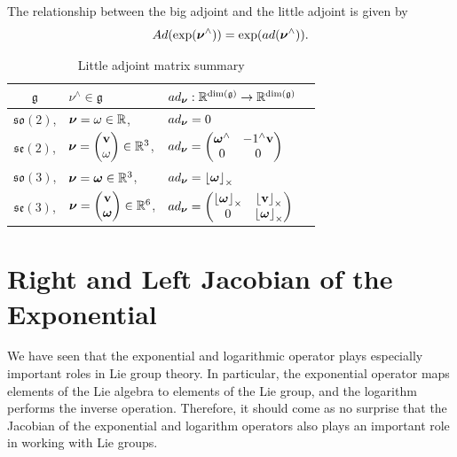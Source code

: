 The relationship between the big adjoint and the little adjoint is given by
\[
Ad(\exp(\boldsymbol{\nu}^\wedge)) = \exp(ad(\boldsymbol{\nu}^\wedge)).
\]

\begin{table}[hhhht]
\caption{Little adjoint matrix summary}
\label{tab:little_adjoint_matrix}
\bgroup
\def\arraystretch{1.0}
\begin{tabular}{clll}
	\toprule
	$\mathfrak{g}$ & $\nu^\wedge \in \mathfrak{g}$ & $ad_{\boldsymbol{\nu}}: \mathbb{R}^{\text{dim}(\mathfrak{g})} \to \mathbb{R}^{\text{dim}(\mathfrak{g})}$ \\
	\midrule
	$\mathfrak{so}(2)$, 
		& $\boldsymbol{\nu} = \omega\in\mathbb{R}$, 
		& $ad_{\boldsymbol{\nu}} = 0$ \\
	$\mathfrak{se}(2)$, 
		&  $\boldsymbol{\nu} = \begin{pmatrix}\mathbf{v} \\ \omega \end{pmatrix} \in \mathbb{R}^3$, 
		& $ad_{\boldsymbol{\nu}} = \begin{pmatrix} \boldsymbol{\omega}^\wedge & -1^\wedge\mathbf{v} \\ 0 & 0 \end{pmatrix}$  \\
	$\mathfrak{so}(3)$, 
		&  $\boldsymbol{\nu} = \boldsymbol{\omega} \in \mathbb{R}^3$, 
		& $ad_{\boldsymbol{\nu}} = \left\lfloor\boldsymbol{\omega}\right\rfloor_{\times}$ \\
	$\mathfrak{se}(3)$, 
		&  $\boldsymbol{\nu} = \begin{pmatrix}\mathbf{v} \\ \boldsymbol{\omega} \end{pmatrix} \in \mathbb{R}^6$, 
		& $ad_{\boldsymbol{\nu}} = \begin{pmatrix} \left\lfloor\boldsymbol{\omega}\right\rfloor_{\times} & \left\lfloor\mathbf{v}\right\rfloor_{\times} \\ 0 & \left\lfloor\boldsymbol{\omega}\right\rfloor_{\times} \end{pmatrix}$ \\
	\bottomrule
\end{tabular}
\egroup
\end{table}





\section{Right and Left Jacobian of the Exponential}

We have seen that the exponential and logarithmic operator plays especially important roles in Lie group theory.  In particular, the exponential operator maps elements of the Lie algebra to elements of the Lie group, and the logarithm performs the inverse operation.  Therefore, it should come as no surprise that the Jacobian of the exponential and logarithm operators also plays an important role in working with Lie groups.

